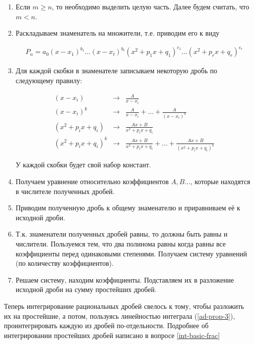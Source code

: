 \begin{enumerate}
  \item Если \(m \ge n\), то необходимо выделить целую часть. Далее будем
  считать, что \(m < n\).
  
  \item Раскладываем знаменатель на множители, т.е. приводим его к виду
  
  \begin{align*}
    P_{n} = a_{0}
      (x - x_{1})^{b_{1}} \dotsc (x - x_{t})^{b_{t}}
      (x^2 + p_{1} x + q_{1})^{c_{1}} \dots (x^2 + p_{r} x + q_{r})^{c_{r}}
  \end{align*}

  \item Для каждой скобки в знаменателе записываем некоторую дробь по
  следующему правилу:
  
  \begin{align*}
    (x - x_{i}) & \to & \frac{A}{x - x_{i}}
    \\
    (x - x_{i})^{k} & \to & \frac{A}{x - x_{i}}
      + \dotsc + \frac{A}{(x - x_{i})^{k}}
    \\
    (x^2 + p_{i} x + q_{i}) & \to & \frac{Ax + B}{x^2 + p_{i} x + q_{i}}
    \\
    (x^2 + p_{i} x + q_{i})^{k} & \to & \frac{Ax + B}{x^2 + p_{i} x + q_{i}}
      + \dotsc + \frac{Ax + B}{(x^2 + p_{i} x + q_{i})^{k}}
  \end{align*}

  У каждой скобки будет свой набор констант.

  \item Получаем уравнение относительно коэффициентов \(A, B \dots\), которые
  находятся в числителе полученных дробей.

  \item Приводим полученную дробь к общему знаменателю и приравниваем её к
  исходной дроби.

  \item Т.к. знаменатели полученных дробей равны, то должны быть равны и
  числители. Пользуемся тем, что два полинома равны когда равны все коэффициенты
  перед одинаковыми степенями. Получаем систему уравнений (по количеству
  коэффициентов).

  \item Решаем систему, находим коэффициенты. Подставляем их в разложение
  исходной дроби на сумму простейших дробей.
\end{enumerate}

Теперь интегрирование рациональных дробей свелось к тому, чтобы разложить их
на простейшие, а потом, пользуясь линейностью интеграла (\ref{ad-prop-3}),
проинтегрировать каждую из дробей по-отдельности.
Подробнее об интегрировании простейших дробей написано в вопросе
\ref{int-basic-frac}

